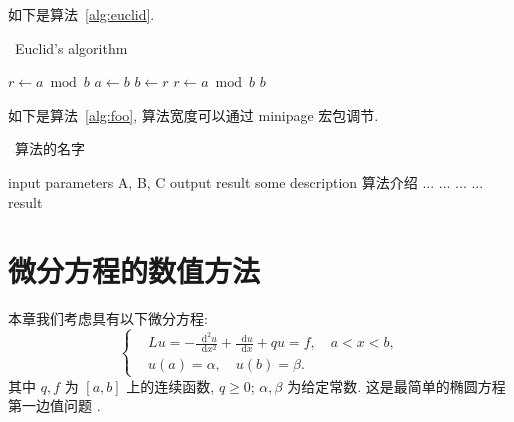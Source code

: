 \documentclass[UTF8,openany]{ctexbook}
\numberwithin{equation}{chapter}
\numberwithin{figure}{chapter}
\numberwithin{table}{chapter}
\theoremstyle{mystyle}
\newcommand{\dif}{\mathop{}\!\mathrm{d}}
\begin{document}
如下是算法~\ref{alg:euclid}.
\begin{algorithm}[H]
\small
\caption{~Euclid's algorithm}\label{alg:euclid}
\begin{algorithmic}[1]
  \State $r\gets a\bmod b$
  \State $a\gets b$
  \State $b\gets r$
  \State $r\gets a\bmod b$
  \EndWhile\label{euclidendwhile}
  \State \Return $b$
  \EndProcedure
\end{algorithmic}
\end{algorithm}


\clearpage
如下是算法~\ref{alg:foo}, 算法宽度可以通过 minipage 宏包调节.

\begin{center}
\vspace{-2ex}
\begin{minipage}{.9\linewidth}
\begin{algorithm}[H]
\small
\caption{~算法的名字}\label{alg:foo}
\begin{algorithmic}[1]
\Require input parameters A, B, C
\Ensure output result
\State some description 算法介绍
  \State ...
    \State ...
    \Else
    \State ...
  \EndIf
\EndFor
{}
  \State ...
\EndWhile
\State \Return result
\end{algorithmic}
\end{algorithm}
\end{minipage}
\end{center}




\chapter{微分方程的数值方法}

本章我们考虑具有以下微分方程:
\begin{equation}\label{eq:PDE}
\left\{\begin{aligned}
& L u=-\frac{{\dif}^{2} u}{\dif x^{2}}+\frac{\dif u}{\dif x}+q u=f, \quad a < x < b, \\
& u(a)=\alpha, \quad u(b)=\beta.
\end{aligned}\right.
\end{equation}
其中 $q, f$ 为 $[a,b]$ 上的连续函数, $q \geqslant 0$; $\alpha, \beta$ 为给定常数. 这是最简单的椭圆方程第一边值问题 .
\end{document}
